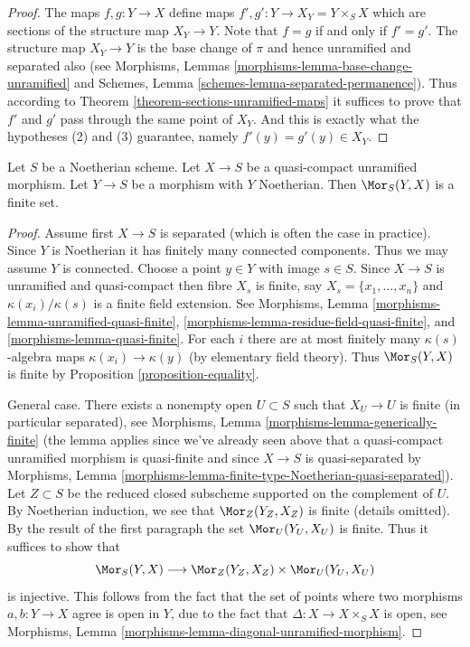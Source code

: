 \begin{proof}
The maps $f, g : Y \to X$ define maps $f', g' : Y \to X_Y = Y \times_S X$
which are sections of the structure map $X_Y \to Y$.
Note that $f = g$ if and only if $f' = g'$.
The structure map $X_Y \to Y$ is the base change of $\pi$ and hence
unramified and separated also (see
Morphisms, Lemmas \ref{morphisms-lemma-base-change-unramified} and
Schemes, Lemma \ref{schemes-lemma-separated-permanence}).
Thus according to Theorem \ref{theorem-sections-unramified-maps}
it suffices to prove that $f'$ and $g'$ pass through the same
point of $X_Y$. And this is exactly what the hypotheses (2) and (3)
guarantee, namely $f'(y) = g'(y) \in X_Y$.
\end{proof}

\begin{lemma}
\label{lemma-finitely-many-maps-to-unramified}
Let $S$ be a Noetherian scheme. Let $X \to S$ be a quasi-compact unramified
morphism. Let $Y \to S$ be a morphism with $Y$ Noetherian. Then
$\Mor_S(Y, X)$ is a finite set.
\end{lemma}

\begin{proof}
Assume first $X \to S$ is separated (which is often the case in practice).
Since $Y$ is Noetherian it has finitely many connected components. Thus we
may assume $Y$ is connected. Choose a point $y \in Y$ with image $s \in S$.
Since $X \to S$ is unramified and quasi-compact
then fibre $X_s$ is finite, say $X_s = \{x_1, \ldots, x_n\}$
and $\kappa(x_i)/\kappa(s)$ is a finite field extension.
See Morphisms, Lemma \ref{morphisms-lemma-unramified-quasi-finite},
\ref{morphisms-lemma-residue-field-quasi-finite}, and
\ref{morphisms-lemma-quasi-finite}.
For each $i$ there are at most finitely many $\kappa(s)$-algebra
maps $\kappa(x_i) \to \kappa(y)$ (by elementary field theory).
Thus $\Mor_S(Y, X)$ is finite by
Proposition \ref{proposition-equality}.

\medskip\noindent
General case. There exists a nonempty open $U \subset S$ such
that $X_U \to U$ is finite (in particular separated), see
Morphisms, Lemma \ref{morphisms-lemma-generically-finite}
(the lemma applies since we've already seen above that a quasi-compact
unramified morphism is quasi-finite and since $X \to S$ is quasi-separated by
Morphisms, Lemma \ref{morphisms-lemma-finite-type-Noetherian-quasi-separated}).
Let $Z \subset S$ be the reduced closed subscheme supported on
the complement of $U$. By Noetherian induction, we see that
$\Mor_Z(Y_Z, X_Z)$ is finite (details omitted).
By the result of the first paragraph the set
$\Mor_U(Y_U, X_U)$ is finite. Thus it suffices to show that
$$
\Mor_S(Y, X) \longrightarrow \Mor_Z(Y_Z, X_Z) \times \Mor_U(Y_U, X_U)
$$
is injective. This follows from the fact that the set of points where
two morphisms $a, b : Y \to X$ agree is open in $Y$, due to the fact
that $\Delta : X \to X \times_S X$ is open, see
Morphisms, Lemma \ref{morphisms-lemma-diagonal-unramified-morphism}.
\end{proof}







